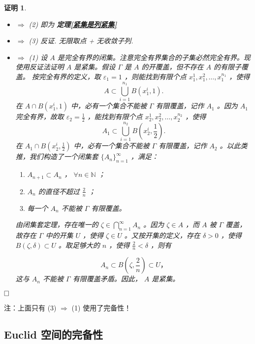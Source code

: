 \documentclass{ctexart}
\newcommand{\。}{．} %
\newenvironment{kuang3}{
    \begin{tcolorbox}[enhanced, breakable, colback=hlan!5!white, boxrule=0pt, frame hidden,
        borderline south={0.5mm}{0.1mm}{hlan}]
    }
    {\end{tcolorbox}}
\newenvironment{lanse}{
    \begin{tcolorbox}[enhanced, breakable, colback=qlan, boxrule=0pt, frame hidden,
        borderline west={0.7mm}{0.1mm}{slan}]
    }
    {\end{tcolorbox}}
\theoremstyle{t} %
\newtheorem*{zmhj}{\color{slan} 证明}
\newenvironment{zm}{\begin{lanse}\begin{zmhj}}{$\hfill \square$\end{zmhj}\end{lanse}}
\begin{document}
\begin{zm} \quad
    \begin{itemize}
        \item [(1)] $\Rightarrow$ (2) 即为 \textbf{定理\ref{紧集是列紧集}}
        \item [(2)] $\Rightarrow$ (3) 反证. 无限取点 + 无收敛子列.
        \item [(3)] $\Rightarrow$ (1) 设  $A$  是完全有界的闭集。注意完全有界集合的子集必然完全有界。现使用反证法证明  $A$  是紧集。假设  $\Gamma$  是  $A$  的开覆盖，但不存在  $A$  的有限子覆盖。
        按完全有界的定义，取  $\varepsilon_1 = 1$ ，则能找到有限个点  $x_{1}^{1}, x_{1}^{2}, \ldots, x_{1}^{n_1}$ ，使得
        $$
            A \subset \bigcup_{i=1}^{n_1} B(x_{1}^{i}, 1).
        $$ 
        在  $A \cap B(x_{1}^{i}, 1)$  中，必有一个集合不能被  $\Gamma$  有限覆盖，记作  $A_1$ 。因为  $A_1$  完全有界，故取  $\varepsilon_2 = \frac{1}{2}$ ，能找到有限个点  $x_{2}^{1}, x_{2}^{2}, \ldots, x_{2}^{n_2}$ ，使得
        $$
            A_1 \subset \bigcup_{i=1}^{n_2} B\left(x_{2}^{i}, \frac{1}{2}\right).
        $$ 
        在  $A_1 \cap B\left(x_{2}^{i}, \frac{1}{2}\right)$  中，必有一个集合不能被  $\Gamma$  有限覆盖，记作  $A_2$ 。以此类推，我们构造了一个闭集套  $\{A_n\}_{n=1}^{\infty}$ ，满足：
        \begin{enumerate}
            \item[(1)]  $A_{n+1} \subset A_n$ ， $\forall n \in \mathbb{N}$ ；
            \item[(2)]  $A_n$  的直径不超过  $\frac{2}{n}$ ；
            \item[(3)] 每一个  $A_n$  不能被  $\Gamma$  有限覆盖。
        \end{enumerate}
        由闭集套定理，存在唯一的  $\zeta \in \bigcap_{n=1}^{\infty} A_n$ 。因为  $\zeta \in A$ ，而  $A$  被  $\Gamma$  覆盖，故存在  $\Gamma$  中的开集  $U$ ，使得  $\zeta \in U$ 。又按开集的定义，存在  $\delta > 0$ ，使得  $B(\zeta, \delta) \subset U$ 。取足够大的  $n$ ，使得  $\frac{2}{n} < \delta$ ，则有
        
        $$
            A_n \subset B\left(\zeta, \frac{2}{n}\right) \subset U，
        $$ 
        这与  $A_n$  不能被  $\Gamma$  有限覆盖矛盾。因此， $A$  是紧集。
    \end{itemize}
\end{zm}

注：上面只有 (3) $\Rightarrow$ (1) 使用了完备性！

\begin{kuang3}
    \subsection{Euclid 空间的完备性}
\end{kuang3}
\end{document}
